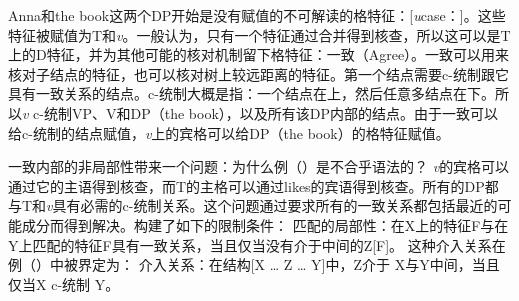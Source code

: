 Anna和the book这两个DP开始是没有赋值的不可解读的格特征：[\textit{u}case：]。这些特征被赋值为T和\textit{v}。一般认为，只有一个特征通过合并得到核查，所以这可以是T上的D特征，并为其他可能的核对机制留下格特征：一致（Agree）。一致可以用来核对子结点的特征，也可以核对树上较远距离的特征。第一个结点需要c-统制跟它具有一致关系的结点。c-统制大概是指：一个结点在上，然后任意多结点在下。所以\textit{v} c-统制VP、V和DP（the book），以及所有该DP内部的结点。由于一致可以给c-统制的结点赋值，\textit{v}上的宾格可以给DP（the book）的格特征赋值。

一致内部的非局部性带来一个问题：为什么例（）是不合乎语法的？
\z
\textit{v}的宾格可以通过它的主语得到核查，而T的主格可以通过likes的宾语得到核查。所有的DP都与T和\textit{v}具有必需的c-统制关系。这个问题通过要求所有的一致关系都包括最近的可能成分而得到解决。\citet[]{Adger2003a}构建了如下的限制条件：
\ea
\label{principle-locality-of-matching}
匹配的局部性：在X上的特征F与在Y上匹配的特征F具有一致关系，当且仅当没有介于中间的Z[F]。
\z
这种介入关系在例（）中被界定为：
\ea
\label{def-intervention}
介入关系：在结构[X \ldots{} Z \ldots{} Y]中，Z介于 X与Y中间，当且仅当X c-统制 Y。
\z

